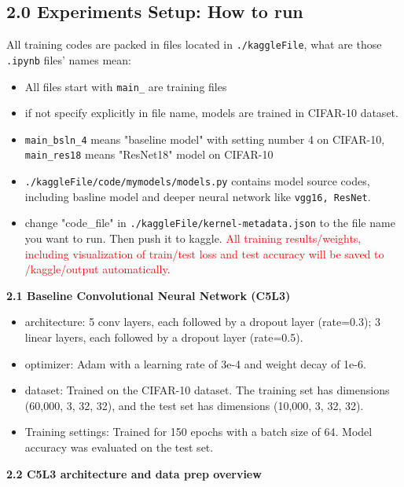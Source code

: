\documentclass{article}
\newcommand{\subs}[1]{\subsection*{#1}}
\begin{document}
\subs{2.0 Experiments Setup: How to run}
All training codes are packed in files located in \texttt{./kaggleFile}, what are those \texttt{.ipynb} files' names mean:
\begin{itemize}
  \item All files start with \texttt{main\_} are training files
  \item if not specify explicitly in file name, models are trained in CIFAR-10 dataset.
  \item \texttt{main\_bsln\_4} means "baseline model" with setting number 4 on CIFAR-10, \texttt{main\_res18} means "ResNet18" model on CIFAR-10 
  \item \texttt{./kaggleFile/code/mymodels/models.py} contains model source codes, including basline model and deeper neural network like \texttt{vgg16, ResNet}.
  \item change "code\_file" in \texttt{./kaggleFile/kernel-metadata.json} to the file name you want to run. Then push it to kaggle. \textcolor{red}{All training results/weights, including visualization of train/test loss and test accuracy will be saved to /kaggle/output automatically.}
\end{itemize}

\noindent \textbf{2.1 Baseline Convolutional Neural Network (C5L3) }
\begin{itemize}
  \item   architecture:  5 conv layers, each followed by a dropout layer (rate=0.3); 3 linear layers, each followed by a dropout layer (rate=0.5).
  \item   optimizer: Adam with a learning rate of 3e-4 and weight decay of 1e-6.
  \item   dataset: Trained on the CIFAR-10 dataset. The training set has dimensions (60,000, 3, 32, 32), and the test set has dimensions (10,000, 3, 32, 32).
  \item   Training settings: Trained for 150 epochs with a batch size of 64. Model accuracy was evaluated on the test set.
\end{itemize}
\vspace{5mm}
\noindent \textbf{2.2 C5L3 architecture and data prep overview}
\end{document}
